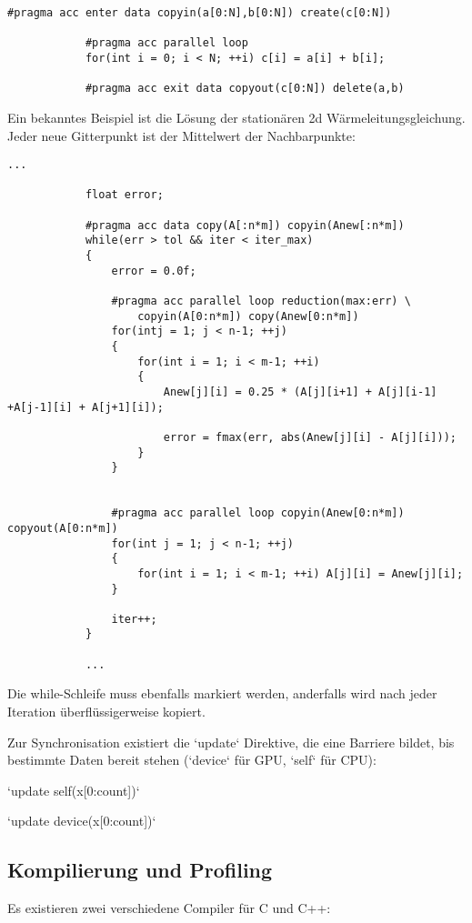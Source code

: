 			\begin{lstlisting}[caption=~OpenACC: Speicherverwaltung]
			#pragma acc enter data copyin(a[0:N],b[0:N]) create(c[0:N])
			
			#pragma acc parallel loop
			for(int i = 0; i < N; ++i) c[i] = a[i] + b[i];
			
			#pragma acc exit data copyout(c[0:N]) delete(a,b)
			\end{lstlisting}
			
			Ein bekanntes Beispiel ist die Lösung der stationären 2d Wärmeleitungsgleichung. Jeder neue Gitterpunkt ist der Mittelwert der Nachbarpunkte:
			\begin{lstlisting}[caption=~OpenACC: Wärmeleitungsgleichung]
			...
			
			float error;
			
			#pragma acc data copy(A[:n*m]) copyin(Anew[:n*m]) 
			while(err > tol && iter < iter_max) 
			{
				error = 0.0f;
				
				#pragma acc parallel loop reduction(max:err) \
					copyin(A[0:n*m]) copy(Anew[0:n*m])
				for(intj = 1; j < n-1; ++j) 
				{
					for(int i = 1; i < m-1; ++i) 
					{
						Anew[j][i] = 0.25 * (A[j][i+1] + A[j][i-1] +A[j-1][i] + A[j+1][i]);
						
						error = fmax(err, abs(Anew[j][i] - A[j][i]));
					}
				}
				
		
				#pragma acc parallel loop copyin(Anew[0:n*m]) copyout(A[0:n*m])
				for(int j = 1; j < n-1; ++j) 
				{
					for(int i = 1; i < m-1; ++i) A[j][i] = Anew[j][i];
				}
				
				iter++;
			}
			
			...
			\end{lstlisting}
			
			Die while-Schleife muss ebenfalls markiert werden, anderfalls wird nach jeder Iteration überflüssigerweise kopiert.
			
			Zur Synchronisation existiert die \li`update` Direktive, die eine Barriere bildet, bis bestimmte Daten bereit stehen (\li`device` für GPU, \li`self` für CPU):
			
			\begin{center} 
			\li`update self(x[0:count])`
			
			\li`update device(x[0:count])`
			\end{center}
			
			\subsection{Kompilierung und Profiling}\label{komp}
			Es existieren zwei verschiedene Compiler für C und C++:
			
